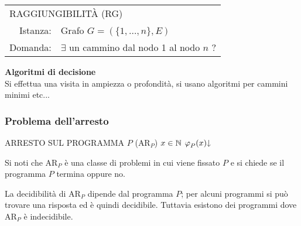 \begin{minipage}{.55\textwidth}
    \begin{flushright}
        \begin{tcolorbox}[
            colback=white,
            sharp corners,
            boxrule=.3mm,
            boxsep=0pt,
            left=6pt,
            hbox
        ]
            \begin{tabular}{r p{13em}}
                \multicolumn{2}{l}{RAGGIUNGIBILITÀ (RG)}\\
                Istanza:& Grafo $G=(\{1,\dots,n\},E)$\\
                Domanda:& $\exists$ un cammino dal nodo 1 al nodo $n$ ?
            \end{tabular}
        \end{tcolorbox}
    \end{flushright}
\end{minipage}
\begin{minipage}{.02\textwidth}\phantom{x}\end{minipage}
\begin{minipage}{.41\textwidth}
    \textbf{Algoritmi di decisione}\\[.5em]
    Si effettua una visita in ampiezza o profondità,
    si usano algoritmi per cammini minimi etc...
\end{minipage}

\subsubsection{Problema dell'arresto}
\begin{center}
    \problema
        {ARRESTO SUL PROGRAMMA $P$ ($\text{AR}_P$)}
        {$x\in\mathbb{N}$}
        {$\semRAM_P(x)\termina$}
\end{center}\vspace{1em}
Si noti che $\text{AR}_P$ è una classe di problemi in cui viene fissato $P$ e si chiede
se il programma $P$ termina oppure no.

La decidibilità di $\text{AR}_P$ dipende dal programma $P$; per alcuni programmi
si può trovare una risposta ed è quindi decidibile. Tuttavia esistono dei programmi
dove $\text{AR}_P$ è indecidibile.\vspace{1em}

